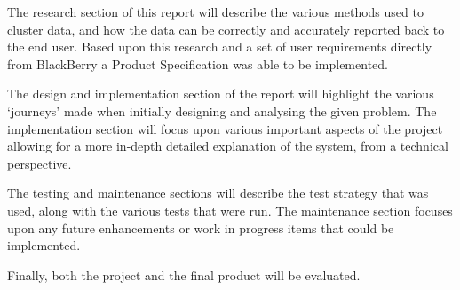 The research section of this report will describe the various methods used to 
cluster data, and how the data can be correctly and accurately reported back to 
the end user. Based upon this research and a set of user requirements directly 
from BlackBerry a Product Specification was able to be implemented.

The design and implementation section of the report will highlight the various 
`journeys' made when initially designing and analysing the given problem. The 
implementation section will focus upon various important aspects of the project
allowing for a more in-depth detailed explanation of the system, from a 
technical perspective.

The testing and maintenance sections will describe the test strategy that was 
used, along with the various tests that were run. The maintenance section 
focuses upon any future enhancements or work in progress items that could be 
implemented.

Finally, both the project and the final product will be evaluated.
